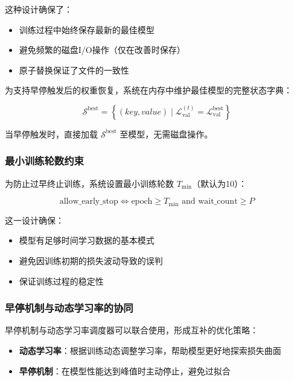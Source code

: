 这种设计确保了：
\begin{itemize}
    \item 训练过程中始终保存最新的最佳模型
    \item 避免频繁的磁盘I/O操作（仅在改善时保存）
    \item 原子替换保证了文件的一致性
\end{itemize}

为支持早停触发后的权重恢复，系统在内存中维护最佳模型的完整状态字典：

\begin{equation}
\mathcal{S}^{\text{best}} = \left\{ (key, value) \mid \mathcal{L}_{\text{val}}^{(t)} = \mathcal{L}_{\text{val}}^{\text{best}} \right\}
\end{equation}

当早停触发时，直接加载 $\mathcal{S}^{\text{best}}$ 至模型，无需磁盘操作。

\subsubsection{最小训练轮数约束}

为防止过早终止训练，系统设置最小训练轮数 $T_{\text{min}}$（默认为10）：

\begin{equation}
\text{allow\_early\_stop} \iff \text{epoch} \geq T_{\text{min}} \text{ and } \text{wait\_count} \geq P
\end{equation}

这一设计确保：
\begin{itemize}
    \item 模型有足够时间学习数据的基本模式
    \item 避免因训练初期的损失波动导致的误判
    \item 保证训练过程的稳定性
\end{itemize}

\subsubsection{早停机制与动态学习率的协同}

早停机制与动态学习率调度器可以联合使用，形成互补的优化策略：

\begin{itemize}
    \item \textbf{动态学习率}：根据训练动态调整学习率，帮助模型更好地探索损失曲面
    \item \textbf{早停机制}：在模型性能达到峰值时主动停止，避免过拟合
\end{itemize}

